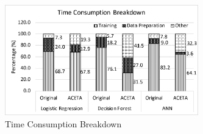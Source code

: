 \begin{figure}[h!]
	\centering
	\includegraphics[width=3.3in]{./fig/perf-breakdown.eps}
	\caption{Time Consumption Breakdown}
	\label{figure:breakdown}
\end{figure}
